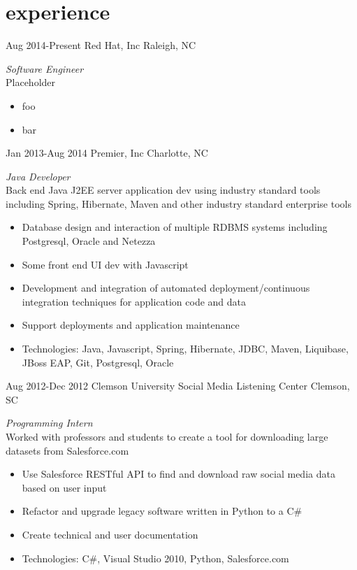 
\section{experience}

\begin{entrylist}


\entry
{Aug 2014-Present}
{Red Hat, Inc}
{Raleigh, NC}
{\emph{Software Engineer} \\
Placeholder
\begin{itemize}
\item foo
\item bar
\end{itemize}}

\entry
{Jan 2013-Aug 2014}
{Premier, Inc}
{Charlotte, NC}
{\emph{Java Developer} \\
Back end Java J2EE server application dev using industry standard tools including Spring, Hibernate, Maven and other industry standard enterprise tools
\begin{itemize}
\item Database design and interaction of multiple RDBMS systems including Postgresql, Oracle and Netezza
\item Some front end UI dev with Javascript
\item Development and integration of automated deployment/continuous integration techniques for application code and data
\item Support deployments and application maintenance
\item Technologies: Java, Javascript, Spring, Hibernate, JDBC, Maven, Liquibase, JBoss EAP, Git, Postgresql, Oracle
\end{itemize}}

\entry
{Aug 2012-Dec 2012}
{Clemson University Social Media Listening Center}
{Clemson, SC}
{\emph{Programming Intern} \\
Worked with professors and students to create a tool for downloading large datasets from Salesforce.com
\begin{itemize}
\item Use Salesforce RESTful API to find and download raw social media data based on user input
\item Refactor and upgrade legacy software written in Python to a C\#
\item Create technical and user documentation
\item Technologies: C\#, Visual Studio 2010, Python, Salesforce.com
\end{itemize}}


\end{entrylist}
